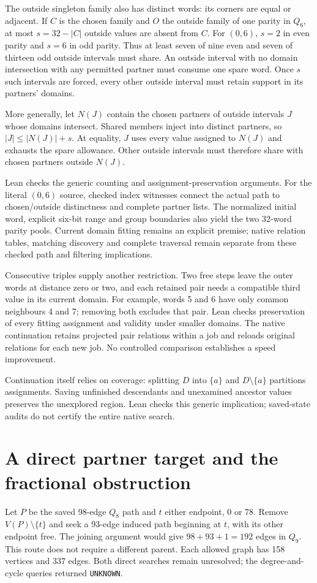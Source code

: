 \documentclass[11pt,a4paper]{article}
\begin{document}
The outside singleton family also has distinct words: its corners are equal
or adjacent. If $C$ is the chosen family and $O$ the outside family of one
parity in $Q_6$, at most $s=32-|C|$ outside values are absent from $C$.
For $(0,6)$, $s=2$ in even parity and $s=6$ in odd parity. Thus at least
seven of nine even and seven of thirteen odd outside intervals must share.
An outside interval with no domain intersection with any permitted partner
must consume one spare word. Once $s$ such intervals are forced, every
other outside interval must retain support in its partners' domains.

More generally, let $N(J)$ contain the chosen partners of outside intervals
$J$ whose domains intersect. Shared members inject into distinct partners,
so $|J|\le|N(J)|+s$. At equality, $J$ uses every value assigned to $N(J)$
and exhausts the spare allowance. Other outside intervals must therefore
share with chosen partners outside $N(J)$.

Lean checks the generic counting and assignment-preservation arguments.
For the literal $(0,6)$ source, checked index witnesses connect the actual
path to chosen/outside distinctness and complete partner lists. The normalized
initial word, explicit six-bit range and group boundaries also yield the
two 32-word parity pools. Current domain fitting remains an explicit premise;
native relation tables, matching discovery and complete traversal remain
separate from these checked path and filtering implications.

Consecutive triples supply another restriction. Two free steps leave the
outer words at distance zero or two, and each retained pair needs a compatible
third value in its current domain. For example, words 5 and 6 have only
common neighbours 4 and 7; removing both excludes that pair.
Lean checks preservation of every fitting assignment and validity under
smaller domains. The native continuation retains projected pair relations
within a job and reloads original relations for each new job.
No controlled comparison establishes a speed improvement.

Continuation itself relies on coverage: splitting $D$ into $\{a\}$ and
$D\setminus\{a\}$ partitions assignments. Saving unfinished descendants and
unexamined ancestor values preserves the unexplored region. Lean checks this
generic implication; saved-state audits do not certify the entire native search.

\section{A direct partner target and the fractional obstruction}
Let $P$ be the saved 98-edge $Q_8$ path and $t$ either endpoint, 0 or 78.
Remove $V(P)\setminus\{t\}$ and seek a 93-edge induced path beginning at $t$,
with its other endpoint free. The joining argument would give
$98+93+1=192$ edges in $Q_9$. This route does not require a different parent.
Each allowed graph has 158 vertices and 337 edges. Both direct searches
remain unresolved; the degree-and-cycle queries returned \texttt{UNKNOWN}.
\end{document}
